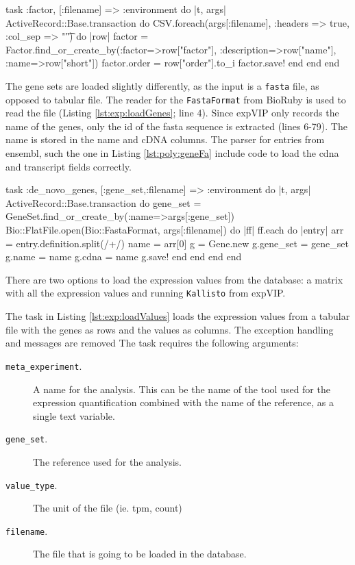 \begin{code}[label=lst:exp:loadFactor, language=ruby, caption={[Load factors]Task that loads factors}]
task :factor, [:filename] => :environment do |t, args|
  ActiveRecord::Base.transaction do 
    CSV.foreach(args[:filename], :headers => true, :col_sep => "\t") do |row|
      factor = Factor.find_or_create_by(:factor=>row["factor"],  :description=>row["name"],  :name=>row["short"])
      factor.order = row["order"].to_i
      factor.save!
    end
  end
end
\end{code}

The gene sets are loaded slightly differently, as the input is a \verb|fasta| file, as opposed to tabular file. 
The reader for the \verb|FastaFormat| from BioRuby \citep{Goto2010} is used to read the file (Listing \ref{lst:exp:loadGenes}; line 4). 
Since expVIP only records the name of the genes, only the id of the fasta sequence is extracted (lines 6-79). 
The name is stored in the name and cDNA columns. 
The parser for entries from ensembl, such the one in Listing \ref{lst:poly:geneFa} include code to load the \acrshort{cdna} and transcript fields correctly. 

\begin{code}[language=ruby, caption={[Load genes from Fasta]Task that load genes from a fasta file}, label=lst:exp:loadGenes]
task :de_novo_genes, [:gene_set,:filename] => :environment do |t, args|
  ActiveRecord::Base.transaction do
    gene_set = GeneSet.find_or_create_by(:name=>args[:gene_set])
    Bio::FlatFile.open(Bio::FastaFormat, args[:filename]) do |ff|
      ff.each do |entry| 
        arr = entry.definition.split(/\s+/)
        name = arr[0]
        g = Gene.new 
        g.gene_set = gene_set
        g.name = name
        g.cdna = name
        g.save!
      end
    end
  end
end
\end{code}

There are two options to load the expression values from the database: a matrix with all the expression values and running \verb|Kallisto| from expVIP. 

The task in Listing \ref{lst:exp:loadValues} loads the expression values from a tabular file with the genes as rows and the values as columns. 
The exception handling and messages are removed 
The task requires the following arguments:

\begin{description}
\item[\texttt{meta\_experiment}.] A name for the analysis. This can be the name of the tool used for the expression quantification combined with the name of the reference, as a single text variable. 
\item[\texttt{gene\_set}.] The reference used for the analysis. 
\item[\texttt{value\_type}.] The unit of the file (ie.  \acrshort{tpm}, count)
\item[\texttt{filename}.] The file that is going to be loaded in the database. 
\end{description}

